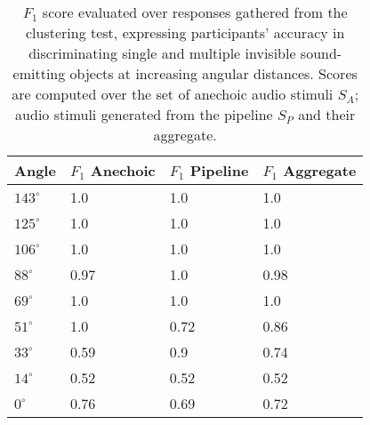 \begin{table}[htbp]
\centering
\begin{tabular}{@{}llll@{}}
\toprule
Angle       & $F_1$ Anechoic & $F_1$ Pipeline & $F_1$ Aggregate \\ \midrule
$143^\circ$ & 1.0            & 1.0            & 1.0             \\
$125^\circ$ & 1.0            & 1.0            & 1.0             \\
$106^\circ$ & 1.0            & 1.0            & 1.0             \\
$ 88^\circ$ & 0.97           & 1.0            & 0.98            \\
$ 69^\circ$ & 1.0            & 1.0            & 1.0             \\
$ 51^\circ$ & 1.0            & 0.72           & 0.86            \\
$ 33^\circ$ & 0.59           & 0.9            & 0.74            \\
$ 14^\circ$ & 0.52           & 0.52           & 0.52            \\
$  0^\circ$ & 0.76           & 0.69           & 0.72            \\ \bottomrule
\end{tabular}
\caption[Psychoacoustic test results --- clustering scores]{$F_1$ score evaluated over responses gathered from the clustering test, expressing participants' accuracy in discriminating single and multiple invisible sound-emitting objects at increasing angular distances. Scores are computed over the set of anechoic audio stimuli $S_A$; audio stimuli generated from the pipeline $S_P$ and their aggregate.}\label{tab:f1-masking}
\end{table}

